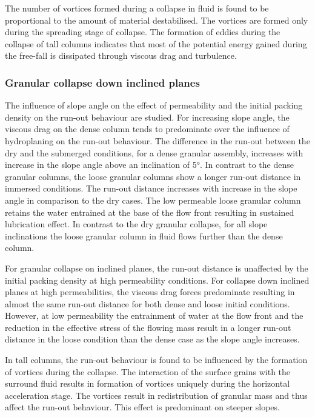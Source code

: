 The number of vortices formed during a collapse in fluid is found to be 
proportional to the amount of material destabilised. The vortices are formed 
only during the spreading stage of collapse. The formation of eddies during the 
collapse of tall columns indicates that most of the potential energy gained 
during the free-fall is dissipated through viscous drag and turbulence.


\subsubsection*{Granular collapse down inclined planes}

The influence of slope angle on the effect of permeability and the initial 
packing density on the run-out behaviour are studied. For increasing slope 
angle, the viscous drag on the dense column tends to predominate over the 
influence of hydroplaning on the run-out behaviour. The difference in the 
run-out between the dry and the submerged conditions, for a dense granular 
assembly, increases with increase in the slope angle above an inclination of 
5\si{\degree}. In contrast to the dense granular columns, the loose granular 
columns show a longer run-out distance in immersed conditions. The run-out 
distance increases with increase in the slope angle in comparison to the dry 
cases. The low permeable loose granular column retains the water entrained at 
the base of the flow front resulting in sustained lubrication effect. In 
contrast to the dry granular collapse, for all slope inclinations the loose 
granular column in fluid flows further than the dense column. 

For granular collapse on inclined planes, the run-out distance is unaffected by 
the initial packing density at high permeability conditions. For collapse down 
inclined planes at high permeabilities, the viscous drag forces predominate 
resulting in almost the same run-out distance for both dense and loose initial 
conditions. However, at low permeability the entrainment of water at the flow 
front and the reduction in the effective stress of the flowing mass result in a 
longer run-out distance in the loose condition than the dense case as the slope 
angle increases.

In tall columns, the run-out behaviour is found to be influenced by the 
formation of vortices during the collapse. The interaction of the surface 
grains with the surround fluid results in formation of vortices uniquely during 
the horizontal acceleration stage. The vortices result in redistribution of 
granular mass and thus affect the run-out behaviour. This effect is 
predominant on steeper slopes. 

